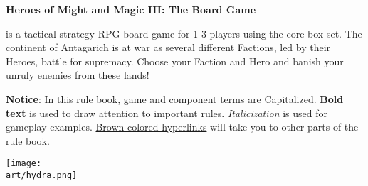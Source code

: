 
\bigbreak

\hypertarget{Heroes of Might and Magic III}{\textbf{Heroes of Might and Magic III: The Board Game}} is a tactical strategy RPG board game for 1-3 players using the core box set.
The continent of Antagarich is at war as several different Factions, led by their Heroes, battle for supremacy. Choose your Faction and Hero and banish your unruly enemies from these lands!

\begin{multicols}{2}
\textbf{Notice}: In this rule book, game and component terms are Capitalized.
\textbf{Bold text} is used to draw attention to important rules.
\textit{Italicization} is used for gameplay examples.
\hyperlink{Heroes of Might and Magic III}{Brown colored hyperlinks} will take you to other parts of the rule book.
\phantom{
  
  
  
}
\vfill
\columnbreak
{}
\vfill
\end{multicols}

\begin{scaledfigure}[blanker]
  \centering
  \texttt{[image: \\art/hydra.png]}
\end{scaledfigure}

